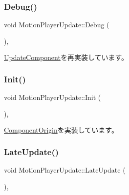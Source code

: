 \subsubsection{\texorpdfstring{Debug()}{Debug()}}
{\footnotesize\ttfamily void Motion\+Player\+Update\+::\+Debug (\begin{DoxyParamCaption}{ }\end{DoxyParamCaption})\hspace{0.3cm}{\ttfamily [override]}, {\ttfamily [virtual]}}



\mbox{\hyperlink{class_update_component_a636b21061765a1101600c3ad70fadeac}{Update\+Component}}を再実装しています。

\mbox{\label{class_motion_player_update_aad6398693d592a24998b1efc91058ec3}} 
\subsubsection{\texorpdfstring{Init()}{Init()}}
{\footnotesize\ttfamily void Motion\+Player\+Update\+::\+Init (\begin{DoxyParamCaption}{ }\end{DoxyParamCaption})\hspace{0.3cm}{\ttfamily [override]}, {\ttfamily [virtual]}}



\mbox{\hyperlink{class_component_origin_a9f674891257f2272b1636d8b6bb05d81}{Component\+Origin}}を実装しています。

\mbox{\label{class_motion_player_update_a6a6d87142fa9efee8f63cf50fa84cf40}} 
\subsubsection{\texorpdfstring{Late\+Update()}{LateUpdate()}}
{\footnotesize\ttfamily void Motion\+Player\+Update\+::\+Late\+Update (\begin{DoxyParamCaption}{ }\end{DoxyParamCaption})\hspace{0.3cm}{\ttfamily [override]}, {\ttfamily [virtual]}}



